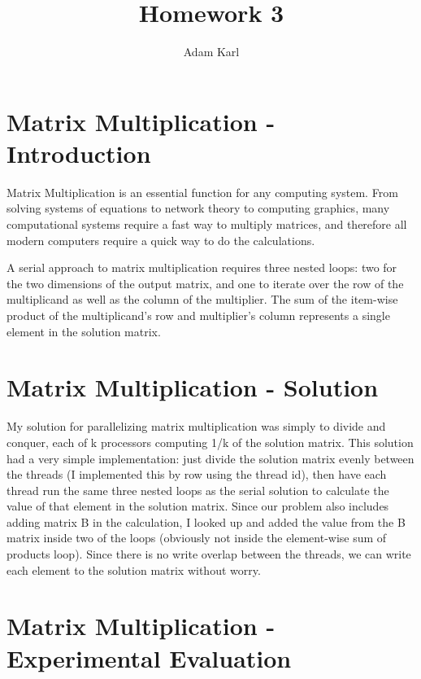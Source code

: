 \documentclass[a4paper]{article}
\title{Homework 3}
\author{Adam Karl}
\begin{document}
\maketitle

\section{Matrix Multiplication - Introduction}
Matrix Multiplication is an essential function for any computing system. From solving systems of equations to network theory to computing graphics, many computational systems require a fast way to multiply matrices, and therefore all modern computers require a quick way to do the calculations.


A serial approach to matrix multiplication requires three nested loops: two for the two dimensions of the output matrix, and one to iterate over the row of the multiplicand as well as the column of the multiplier. The sum of the item-wise product of the multiplicand's row and multiplier's column represents a single element in the solution matrix.

\section{Matrix Multiplication - Solution}

My solution for parallelizing matrix multiplication was simply to divide and conquer, each of k processors computing 1/k of the solution matrix. This solution had a very simple implementation: just divide the solution matrix evenly between the threads (I implemented this by row using the thread id), then have each thread run the same three nested loops as the serial solution to calculate the value of that element in the solution matrix. Since our problem also includes adding matrix B in the calculation, I looked up and added the value from the B matrix inside two of the loops (obviously not inside the element-wise sum of products loop). Since there is no write overlap between the threads, we can write each element to the solution matrix without worry.

\section{Matrix Multiplication - Experimental Evaluation}
\end{document}
